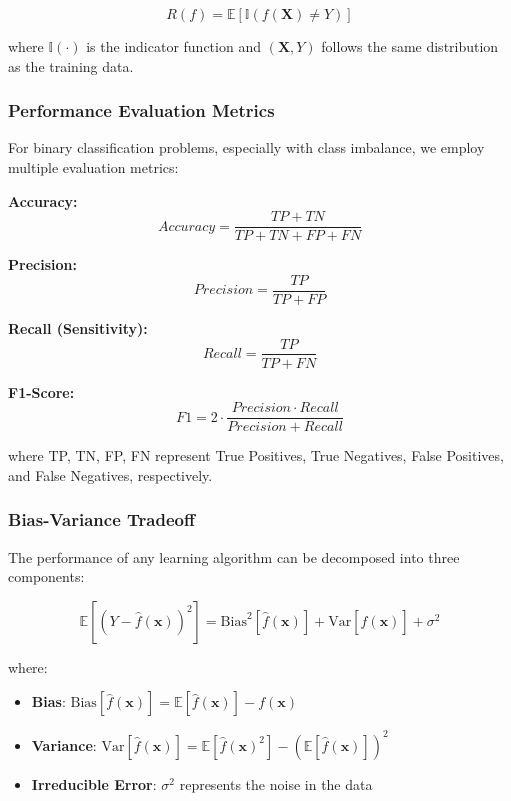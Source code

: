 \begin{equation}
R(f) = \mathbb{E}[\mathbb{I}(f(\mathbf{X}) \neq Y)]
\end{equation}

where $\mathbb{I}(\cdot)$ is the indicator function and $(\mathbf{X}, Y)$ follows the same distribution as the training data.

\subsubsection{Performance Evaluation Metrics}
For binary classification problems, especially with class imbalance, we employ multiple evaluation metrics:

\textbf{Accuracy:}
\begin{equation}
Accuracy = \frac{TP + TN}{TP + TN + FP + FN}
\end{equation}

\textbf{Precision:}
\begin{equation}
Precision = \frac{TP}{TP + FP}
\end{equation}

\textbf{Recall (Sensitivity):}
\begin{equation}
Recall = \frac{TP}{TP + FN}
\end{equation}

\textbf{F1-Score:}
\begin{equation}
F1 = 2 \cdot \frac{Precision \cdot Recall}{Precision + Recall}
\end{equation}

where TP, TN, FP, FN represent True Positives, True Negatives, False Positives, and False Negatives, respectively.

\subsubsection{Bias-Variance Tradeoff}
The performance of any learning algorithm can be decomposed into three components:

\begin{equation}
\mathbb{E}[(Y - \hat{f}(\mathbf{x}))^2] = \text{Bias}^2[\hat{f}(\mathbf{x})] + \text{Var}[\hat{f}(\mathbf{x})] + \sigma^2
\end{equation}

where:
\begin{itemize}
    \item \textbf{Bias}: $\text{Bias}[\hat{f}(\mathbf{x})] = \mathbb{E}[\hat{f}(\mathbf{x})] - f(\mathbf{x})$
    \item \textbf{Variance}: $\text{Var}[\hat{f}(\mathbf{x})] = \mathbb{E}[\hat{f}(\mathbf{x})^2] - (\mathbb{E}[\hat{f}(\mathbf{x})])^2$
    \item \textbf{Irreducible Error}: $\sigma^2$ represents the noise in the data
\end{itemize}

